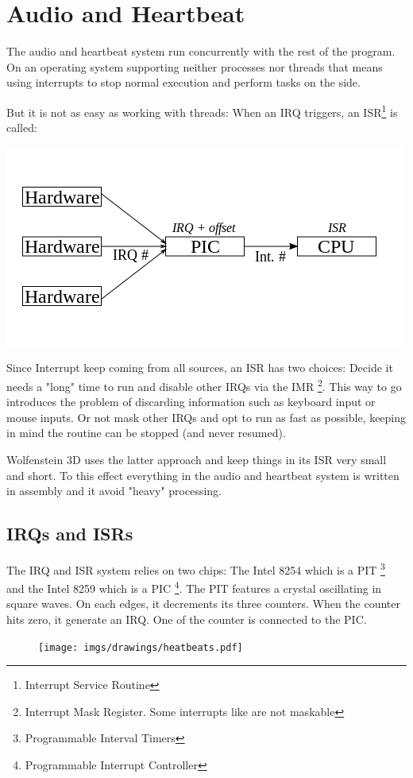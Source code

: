 \section{Audio and Heartbeat}
The audio and heartbeat system run concurrently with the rest of the program. On an operating system supporting neither processes nor threads that means using interrupts to stop normal execution and perform tasks on the side.\\
\par
But it is not as easy as working with threads: When an IRQ triggers, an ISR\footnote{Interrupt Service Routine} is called:

\includegraphics[width=.9\textwidth]{imgs/drawings/irqs/explanation.png}
\par
 Since Interrupt keep coming from all sources, an ISR has two choices: Decide it needs a "long" time to run and disable other IRQs via the IMR \footnote{Interrupt Mask Register. Some interrupts like are not maskable}. This way to go introduces the problem of discarding information such as keyboard input or mouse inputs. Or not mask other IRQs and opt to run as fast as possible, keeping in mind the routine can be stopped (and never resumed).\\
 \par
 Wolfenstein 3D uses the latter approach and keep things in its ISR very small and short. To this effect everything in the audio and heartbeat system is written in assembly and it avoid "heavy" processing.

\subsection{IRQs and ISRs}
The IRQ and ISR system relies on two chips: The Intel 8254 which is a PIT \footnote{Programmable Interval Timers} and the Intel 8259 which is a PIC \footnote{Programmable Interrupt Controller}. The PIT features a crystal oscillating in square waves. On each edges, it decrements its three counters. When the counter hits zero, it generate an IRQ. One of the counter is connected to the PIC. 
\par
\begin{figure}[H]
\centering
 \texttt{[image: imgs/drawings/heatbeats.pdf]}
 \end{figure}
\par

